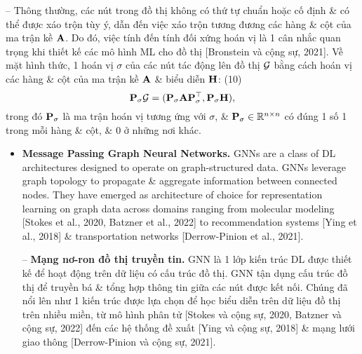 \documentclass{article}
\begin{document}
\begin{itemize}
    -- Thông thường, các nút trong đồ thị không có thứ tự chuẩn hoặc cố định \& có thể được xáo trộn tùy ý, dẫn đến việc xáo trộn tương đương các hàng \& cột của ma trận kề ${\bf A}$. Do đó, việc tính đến tính đối xứng hoán vị là 1 cân nhắc quan trọng khi thiết kế các mô hình ML cho đồ thị [Bronstein và cộng sự, 2021]. Về mặt hình thức, 1 hoán vị $\sigma$ của các nút tác động lên đồ thị ${\cal G}$ bằng cách hoán vị các hàng \& cột của ma trận kề ${\bf A}$ \& biểu diễn ${\bf H}$: (10)
    \begin{equation*}
        {\bf P}_\sigma{\cal G} = ({\bf P}_\sigma{\bf A}{\bf P}_\sigma^\top,{\bf P}_\sigma{\bf H}),
    \end{equation*}
    trong đó ${\bf P}_\sigma$ là ma trận hoán vị tương ứng với $\sigma$, \& ${\bf P}_\sigma\in\mathbb{R}^{n\times n}$ có đúng 1 số 1 trong mỗi hàng \& cột, \& 0 ở những nơi khác.
    \begin{itemize}
        \item {\bf Message Passing Graph Neural Networks.} GNNs are a class of DL architectures designed to operate on graph-structured data. GNNs leverage graph topology to propagate \& aggregate information between connected nodes. They have emerged as architecture of choice for representation learning on graph data across domains ranging from molecular modeling [Stokes et al., 2020, Batzner et al., 2022] to recommendation systems [Ying et al., 2018] \& transportation networks [Derrow-Pinion et al., 2021].
        
        -- {\bf Mạng nơ-ron đồ thị truyền tin.} GNN là 1 lớp kiến trúc DL được thiết kế để hoạt động trên dữ liệu có cấu trúc đồ thị. GNN tận dụng cấu trúc đồ thị để truyền bá \& tổng hợp thông tin giữa các nút được kết nối. Chúng đã nổi lên như 1 kiến trúc được lựa chọn để học biểu diễn trên dữ liệu đồ thị trên nhiều miền, từ mô hình phân tử [Stokes và cộng sự, 2020, Batzner và cộng sự, 2022] đến các hệ thống đề xuất [Ying và cộng sự, 2018] \& mạng lưới giao thông [Derrow-Pinion và cộng sự, 2021].
        

\end{itemize}
\end{itemize}
\end{document}
